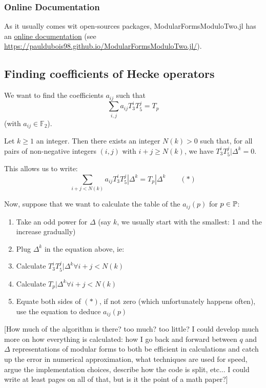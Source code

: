 \subsubsection{Online Documentation}
As it usually comes wit open-sources packages, ModularFormsModuloTwo.jl has an \href{https://pauldubois98.github.io/ModularFormsModuloTwo.jl/}{online documentation} (see \url{https://pauldubois98.github.io/ModularFormsModuloTwo.jl/}).




\subsection{Finding coefficients of Hecke operators}

We want to find the coefficients $a_{ij}$ such that $$\sum_{i, j} a_{ij} T_3^iT_5^j = T_p$$
(with $a_{ij} \in \mathbb{F}_2$).

Let $k\geq 1$ an integer.
Then there exists an integer $N(k)>0$ such that,
for all pairs of non-negative integers $(i, j)$ with $i+j \geq N(k)$,
we have $T_3^{i}T_5^{j}|\Delta^k = 0$.

This allows us to write:
$$\sum_{i+j < N(k)} a_{ij} T_3^iT_5^j|\Delta^k= T_p|\Delta^k \qquad (*)$$

Now, suppose that we want to calculate the table of the $a_{ij}(p)$ for $p \in \mathbb{P}$:
\begin{enumerate}
    \item Take an odd power for $\Delta$ (say $k$, we usually start with the smallest: 1 and the increase gradually)
    \item Plug $\Delta^k$ in the equation above, ie:
    \item Calculate $T_3^iT_5^j|\Delta^k \forall i+j < N(k)$
    \item Calculate $T_p|\Delta^k \forall i+j < N(k)$
    \item Equate both sides of $(*)$, if not zero (which unfortunately happens often), use the equation to deduce $a_{ij}(p)$
\end{enumerate}

[How much of the algorithm is there? too much? too little? I could develop much more on how everything is calculated: how I go back and forward between $q$ and $\Delta$ representations of modular forms to both be efficient in calculations and catch up the error in numerical approximation, what techniques are used for speed, argue the implementation choices, describe how the code is split, etc... I could write at least  pages on all of that, but is it the point of a math paper?]
